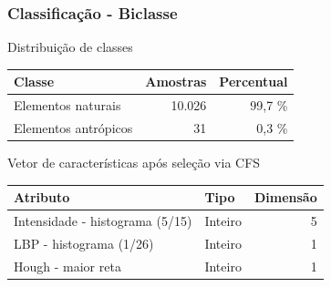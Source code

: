 \documentclass[t]{beamer}
\begin{document}
\begin{frame}[c]
	\frametitle{Classificação - Biclasse}

	\centering
	Distribuição de classes

	\small{
		\begin{table}[h]
		\centering
		\begin{tabulary}{\linewidth}{|L|R|R|}
		\hline
		\textbf{Classe} & \textbf{Amostras} & \textbf{Percentual} \\ \hline
		Elementos naturais   & 10.026 & 99,7 \% \\ \hline
		Elementos antrópicos &     31 &  0,3 \% \\ \hline
		\end{tabulary}
	\end{table}
	}

	\centering
	Vetor de características após seleção via CFS

	\small{
		\begin{table}[h]
		\centering
		\begin{tabulary}{\linewidth}{|L|L|R|}
		\hline
		\textbf{Atributo} & \textbf{Tipo} & \textbf{Dimensão} \\ \hline
		Intensidade - histograma (5/15) & Inteiro & 5 \\ \hline
		LBP - histograma (1/26)         & Inteiro & 1 \\ \hline
		Hough - maior reta              & Inteiro & 1 \\ \hline
		\end{tabulary}
		\end{table}
	}

\end{frame}
\end{document}
